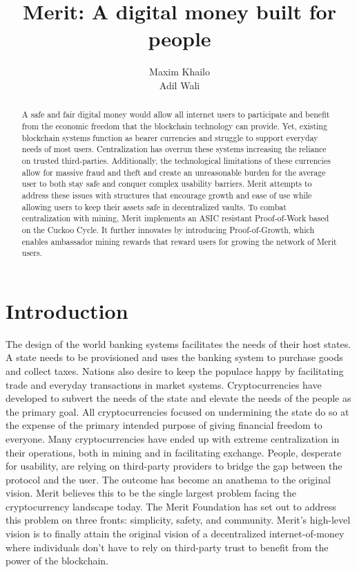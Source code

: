 \documentclass{article}
\title{Merit: A digital money built for people}
\author{Maxim Khailo \\ Adil Wali}
\begin{document}
\maketitle

\begin{abstract}
    A safe and fair digital money would allow all internet users to participate and
    benefit from the economic freedom that the \gls{blockchain} technology can provide.
    Yet, existing blockchain systems function as bearer currencies and struggle to support
     everyday needs of most users. Centralization has overrun these systems increasing
     the reliance on trusted third-parties. Additionally, the technological limitations of
     these currencies allow for massive fraud and theft and create an unreasonable burden
    for the average user to both stay safe and conquer complex usability barriers. Merit attempts to address these issues
    with structures that encourage growth and ease of use while allowing users
    to keep their assets safe in \gls{decentralized vaults}. To combat centralization
    with mining, Merit implements an \gls{ASIC} resistant Proof-of-Work based on the
    Cuckoo Cycle.  It further innovates by introducing Proof-of-Growth, which enables ambassador mining 
    rewards that reward users for growing the network of Merit users.  
\end{abstract}

\section{Introduction}

The design of the world banking systems facilitates the needs of their host states.
A state needs to be provisioned and uses the banking system to purchase goods
and collect taxes. Nations also desire to keep the populace happy by facilitating
trade and everyday \glspl{transaction} in market systems. Cryptocurrencies
have developed to subvert the needs of the state and elevate the needs of the
people as the primary goal. All cryptocurrencies focused
on undermining the state do so at the expense of the primary intended purpose of giving
financial freedom to everyone. Many cryptocurrencies have ended up with extreme
centralization in their operations, both in mining and in facilitating exchange.
People, desperate for usability, are relying on third-party providers to bridge the gap between the protocol and the user.
The outcome has become an anathema to the original vision. Merit believes this to be the single largest 
problem facing the cryptocurrency landscape today.  The Merit Foundation has set out to
address this problem on three fronts: simplicity, safety, and community. Merit's high-level 
vision is to finally attain the original vision of a decentralized internet-of-money
 where individuals don't have to rely on third-party trust to benefit from the power of the blockchain.
\end{document}
